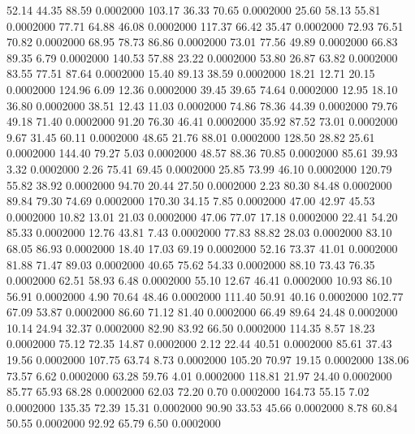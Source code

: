   52.14   44.35   88.59   0.0002000
 103.17   36.33   70.65   0.0002000
  25.60   58.13   55.81   0.0002000
  77.71   64.88   46.08   0.0002000
 117.37   66.42   35.47   0.0002000
  72.93   76.51   70.82   0.0002000
  68.95   78.73   86.86   0.0002000
  73.01   77.56   49.89   0.0002000
  66.83   89.35    6.79   0.0002000
 140.53   57.88   23.22   0.0002000
  53.80   26.87   63.82   0.0002000
  83.55   77.51   87.64   0.0002000
  15.40   89.13   38.59   0.0002000
  18.21   12.71   20.15   0.0002000
 124.96    6.09   12.36   0.0002000
  39.45   39.65   74.64   0.0002000
  12.95   18.10   36.80   0.0002000
  38.51   12.43   11.03   0.0002000
  74.86   78.36   44.39   0.0002000
  79.76   49.18   71.40   0.0002000
  91.20   76.30   46.41   0.0002000
  35.92   87.52   73.01   0.0002000
   9.67   31.45   60.11   0.0002000
  48.65   21.76   88.01   0.0002000
 128.50   28.82   25.61   0.0002000
 144.40   79.27    5.03   0.0002000
  48.57   88.36   70.85   0.0002000
  85.61   39.93    3.32   0.0002000
   2.26   75.41   69.45   0.0002000
  25.85   73.99   46.10   0.0002000
 120.79   55.82   38.92   0.0002000
  94.70   20.44   27.50   0.0002000
   2.23   80.30   84.48   0.0002000
  89.84   79.30   74.69   0.0002000
 170.30   34.15    7.85   0.0002000
  47.00   42.97   45.53   0.0002000
  10.82   13.01   21.03   0.0002000
  47.06   77.07   17.18   0.0002000
  22.41   54.20   85.33   0.0002000
  12.76   43.81    7.43   0.0002000
  77.83   88.82   28.03   0.0002000
  83.10   68.05   86.93   0.0002000
  18.40   17.03   69.19   0.0002000
  52.16   73.37   41.01   0.0002000
  81.88   71.47   89.03   0.0002000
  40.65   75.62   54.33   0.0002000
  88.10   73.43   76.35   0.0002000
  62.51   58.93    6.48   0.0002000
  55.10   12.67   46.41   0.0002000
  10.93   86.10   56.91   0.0002000
   4.90   70.64   48.46   0.0002000
 111.40   50.91   40.16   0.0002000
 102.77   67.09   53.87   0.0002000
  86.60   71.12   81.40   0.0002000
  66.49   89.64   24.48   0.0002000
  10.14   24.94   32.37   0.0002000
  82.90   83.92   66.50   0.0002000
 114.35    8.57   18.23   0.0002000
  75.12   72.35   14.87   0.0002000
   2.12   22.44   40.51   0.0002000
  85.61   37.43   19.56   0.0002000
 107.75   63.74    8.73   0.0002000
 105.20   70.97   19.15   0.0002000
 138.06   73.57    6.62   0.0002000
  63.28   59.76    4.01   0.0002000
 118.81   21.97   24.40   0.0002000
  85.77   65.93   68.28   0.0002000
  62.03   72.20    0.70   0.0002000
 164.73   55.15    7.02   0.0002000
 135.35   72.39   15.31   0.0002000
  90.90   33.53   45.66   0.0002000
   8.78   60.84   50.55   0.0002000
  92.92   65.79    6.50   0.0002000
